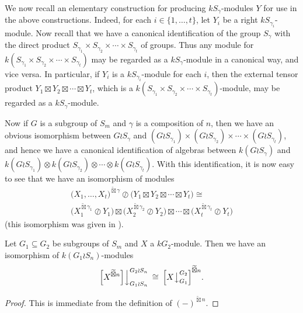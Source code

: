 We now recall an elementary construction for producing $kS_{\gamma}$-modules $Y$ for use in the above constructions. Indeed, for each
$i \in \{1,\ldots,t\}$, let $Y_i$ be a right $kS_{\gamma_i}$-module. Now recall that we have a canonical identification of the group
$S_{\gamma}$ with the direct product $S_{\gamma_1}\times S_{\gamma_2}\times\cdots\times S_{\gamma_t}$ of groups. Thus any module for
$k(S_{\gamma_1}{\times}S_{\gamma_2}{\times}\cdots{\times}S_{\gamma_t})$ may be regarded as a $kS_{\gamma}$-module in a canonical way, and vice
versa. In particular, if $Y_i$ is a $kS_{\gamma_i}$-module for each $i$, then the external tensor product
$Y_1 \boxtimes Y_2 \boxtimes \cdots \boxtimes Y_t$, which is a
$k\left(S_{\gamma_1}\times S_{\gamma_2}\times\cdots\times S_{\gamma_t}\right)$-module, may be regarded as a $kS_{\gamma}$-module.

Now if $G$ is a subgroup of $S_m$ and $\gamma$ is a composition of $n$, then we have an obvious isomorphism between $G{\wr}S_{\gamma}$ and 
$\left(G{\wr}S_{\gamma_1}\right)\times\left(G{\wr}S_{\gamma_2}\right)\times\cdots\times\left(G{\wr}S_{\gamma_t}\right)$, and hence we have a
canonical identification of algebras between $k(G{\wr}S_{\gamma})$ and
$k\left(G{\wr}S_{\gamma_1}\right)\otimes k\left(G{\wr}S_{\gamma_2}\right)\otimes\cdots \otimes k\left(G{\wr}S_{\gamma_t}\right)$.
With this identification, it is now easy to see that we have an isomorphism of modules
\begin{multline}\label{mod_wprd_etp_vrs:eq}
\bigl(X_1,\ldots,X_t\bigr)^{\widetilde\boxtimes\gamma} {\oslash}\bigl(Y_1 \boxtimes Y_2 \boxtimes \cdots\boxtimes Y_t\bigr)
\cong\\
	\bigl(X_1^{\widetilde\boxtimes \gamma_1}\oslash Y_1\bigr)\boxtimes
	\bigl(X_2^{\widetilde\boxtimes \gamma_2}\oslash Y_2\bigr)\boxtimes\cdots
	\boxtimes\bigl(X_t^{\widetilde\boxtimes \gamma_t}\oslash Y_t\bigr)
\end{multline}
(this isomorphism was given in \cite[Lemma 3.2 (1)]{CHTAN}).

\begin{prop}\label{res_comm_tilde_boxtimes:prop}
Let $G_1 \subseteq G_2$ be subgroups of $S_m$ and $X$ a $kG_2$-module. Then we have an isomorphism of $k(G_1 \wr S_n)$-modules
\[
\Bigl[X^{\widetilde\boxtimes n}\Bigr]\Bigr\downarrow^{G_2 \wr S_n}_{G_1 \wr S_n} \:\cong\:
\Bigl[X\bigr\downarrow^{G_2}_{G_1}\Bigl]^{\widetilde\boxtimes n}.
\]
\end{prop}
\begin{proof}
This is immediate from the definition of $(-)^{\widetilde\boxtimes n}$.
\end{proof}

